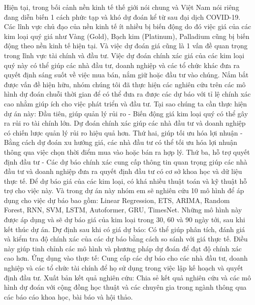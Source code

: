 Hiện tại, trong bối cảnh nền kinh tế thế giới nói chung và Việt Nam nói riêng đang diễn biến 1 cách phức tạp và khó dự đoán kể từ sau đại dịch COVID-19. Các lĩnh vực chủ đạo của nền kinh tế ít nhiều bị biến động do đó việc giá của các kim loại quý giá như Vàng (Gold), Bạch kim (Platinum), Palladium cũng bị biến động theo nền kinh tế hiện tại. Và việc dự đoán giá cũng là 1 vấn đề quan trọng trong lĩnh vực tài chính và đầu tư. Việc dự đoán chính xác giá của các kim loại quý này có thể giúp các nhà đầu tư, doanh nghiệp và các tổ chức khác đưa ra quyết định sáng suốt về việc mua bán, nắm giữ hoặc đầu tư vào chúng. Nắm bắt được vấn đề hiện hữu, nhóm chúng tôi đã thực hiện các nghiên cứu trên các mô hình dự đoán chuỗi thời gian để có thể đưa ra được các dự báo với tỉ lệ chính xác cao nhằm giúp ích cho việc phát triển và đầu tư.\newline
Tại sao chúng ta cần thực hiện dự án này: Đầu tiên, giúp quản lý rủi ro - Biến động giá kim loại quý có thể gây ra rủi ro tài chính lớn. Dự đoán chính xác giúp các nhà đầu tư và doanh nghiệp có chiến lược quản lý rủi ro hiệu quả hơn. Thứ hai, giúp tối ưu hóa lợi nhuận - Bằng cách dự đoán xu hướng giá, các nhà đầu tư có thể tối ưu hóa lợi nhuận thông qua việc chọn thời điểm mua vào hoặc bán ra hợp lý. Thứ ba, hỗ trợ quyết định đầu tư - Các dự báo chính xác cung cấp thông tin quan trọng giúp các nhà đầu tư và doanh nghiệp đưa ra quyết định đầu tư có cơ sở khoa học và dữ liệu thực tế.\newline
Để dự báo giá của các kim loại, có khá nhiều thuật toán và kỹ thuật hỗ trợ cho việc này. Và trong dự án này nhóm em sẽ nghiên cứu 10 mô hình để áp dụng cho việc dự báo bao gồm: Linear Regression, ETS, ARIMA, Random Forest, RNN, SVM, LSTM, Autoformer, GRU, TimesNet. Những mô hình này được áp dụng và sẽ dự báo giá của kim loại trong 30, 60 và 90 ngày tới, sau khi kết thúc dự án. \newline
Dự định sau khi có giá dự báo: Có thể giúp phân tích, đánh giá và kiểm tra độ chính xác của các dự báo bằng cách so sánh với giá thực tế. Điều này giúp tinh chỉnh các mô hình và phương pháp dự đoán để đạt độ chính xác cao hơn. Ứng dụng vào thực tế: Cung cấp các dự báo cho các nhà đầu tư, doanh nghiệp và các tổ chức tài chính để họ sử dụng trong việc lập kế hoạch và quyết định đầu tư. Xuất bản kết quả nghiên cứu: Chia sẻ kết quả nghiên cứu và các mô hình dự đoán với cộng đồng học thuật và các chuyên gia trong ngành thông qua các báo cáo khoa học, bài báo và hội thảo.